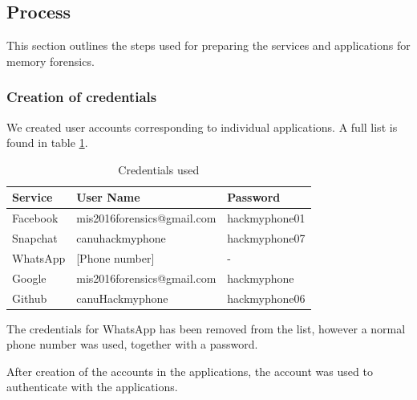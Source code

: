\subsection{Process} %
This section outlines the steps used for preparing the services and applications for memory forensics.

\subsubsection{Creation of credentials}
We created user accounts corresponding to individual applications. A full list is found in table \ref{tbl:credentials}.\\
\begin{table}
\begin{tabular}{l|l|l}
Service & User Name & Password \\ 
\hline 
Facebook & mis2016forensics@gmail.com & hackmyphone01 \\ 
Snapchat & canuhackmyphone & hackmyphone07 \\ 
WhatsApp & [Phone number] & - \\ 
Google & mis2016forensics@gmail.com & hackmyphone \\ 
Github & canuHackmyphone & hackmyphone06 \\ 
\end{tabular} 
\caption{Credentials used}
\label{tbl:credentials}
\end{table}

The credentials for WhatsApp has been removed from the list, however a normal phone number was used, together with a password.

After creation of the accounts in the applications, the account was used to authenticate with the applications.

